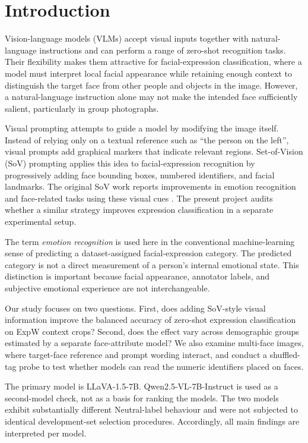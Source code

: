\documentclass[lettersize,journal]{IEEEtran}
\begin{document}
\section{Introduction}
Vision-language models (VLMs) accept visual inputs together with natural-language instructions and can perform a range of zero-shot recognition tasks. Their flexibility makes them attractive for facial-expression classification, where a model must interpret local facial appearance while retaining enough context to distinguish the target face from other people and objects in the image. However, a natural-language instruction alone may not make the intended face sufficiently salient, particularly in group photographs.

Visual prompting attempts to guide a model by modifying the image itself. Instead of relying only on a textual reference such as ``the person on the left'', visual prompts add graphical markers that indicate relevant regions. Set-of-Vision (SoV) prompting applies this idea to facial-expression recognition by progressively adding face bounding boxes, numbered identifiers, and facial landmarks. The original SoV work reports improvements in emotion recognition and face-related tasks using these visual cues \cite{zhang2024sov}. The present project audits whether a similar strategy improves expression classification in a separate experimental setup.

The term \emph{emotion recognition} is used here in the conventional machine-learning sense of predicting a dataset-assigned facial-expression category. The predicted category is not a direct measurement of a person's internal emotional state. This distinction is important because facial appearance, annotator labels, and subjective emotional experience are not interchangeable.

Our study focuses on two questions. First, does adding SoV-style visual information improve the balanced accuracy of zero-shot expression classification on ExpW context crops? Second, does the effect vary across demographic groups estimated by a separate face-attribute model? We also examine multi-face images, where target-face reference and prompt wording interact, and conduct a shuffled-tag probe to test whether models can read the numeric identifiers placed on faces.

The primary model is LLaVA-1.5-7B. Qwen2.5-VL-7B-Instruct is used as a second-model check, not as a basis for ranking the models. The two models exhibit substantially different Neutral-label behaviour and were not subjected to identical development-set selection procedures. Accordingly, all main findings are interpreted per model.
\end{document}
